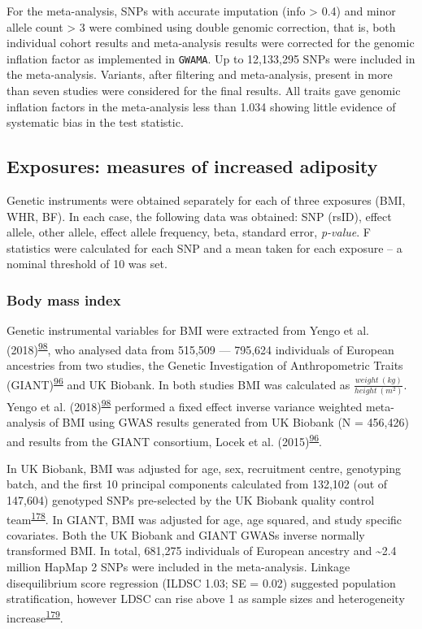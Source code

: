 \documentclass[11pt,twoside]{bristolthesis}
\begin{document}
For the meta-analysis, SNPs with accurate imputation (info \textgreater{} 0.4) and minor allele count \textgreater{} 3 were combined using double genomic correction, that is, both individual cohort results and meta-analysis results were corrected for the genomic inflation factor as implemented in \texttt{GWAMA}. Up to 12,133,295 SNPs were included in the meta-analysis. Variants, after filtering and meta-analysis, present in more than seven studies were considered for the final results. All traits gave genomic inflation factors in the meta-analysis less than 1.034 showing little evidence of systematic bias in the test statistic.

\hypertarget{exposures-measures-of-increased-adiposity}{%
\subsection{Exposures: measures of increased adiposity}\label{exposures-measures-of-increased-adiposity}}

Genetic instruments were obtained separately for each of three exposures (BMI, WHR, BF). In each case, the following data was obtained: SNP (rsID), effect allele, other allele, effect allele frequency, beta, standard error, \emph{p-value}. F statistics were calculated for each SNP and a mean taken for each exposure -- a nominal threshold of 10 was set.

\hypertarget{body-mass-index}{%
\subsubsection{Body mass index}\label{body-mass-index}}

Genetic instrumental variables for BMI were extracted from Yengo et al. (2018)\textsuperscript{\protect\hyperlink{ref-Yengo2018}{98}}, who analysed data from 515,509 --- 795,624 individuals of European ancestries from two studies, the Genetic Investigation of Anthropometric Traits (GIANT)\textsuperscript{\protect\hyperlink{ref-Locke2015}{96}} and UK Biobank. In both studies BMI was calculated as \(\displaystyle \frac{weight\ (kg)}{height\ (m^2)}\). Yengo et al. (2018)\textsuperscript{\protect\hyperlink{ref-Yengo2018}{98}} performed a fixed effect inverse variance weighted meta-analysis of BMI using GWAS results generated from UK Biobank (N = 456,426) and results from the GIANT consortium, Locek et al. (2015)\textsuperscript{\protect\hyperlink{ref-Locke2015}{96}}.

In UK Biobank, BMI was adjusted for age, sex, recruitment centre, genotyping batch, and the first 10 principal components calculated from 132,102 (out of 147,604) genotyped SNPs pre-selected by the UK Biobank quality control team\textsuperscript{\protect\hyperlink{ref-Bycroft2018}{178}}. In GIANT, BMI was adjusted for age, age squared, and study specific covariates. Both the UK Biobank and GIANT GWASs inverse normally transformed BMI. In total, 681,275 individuals of European ancestry and \textasciitilde{}2.4 million HapMap 2 SNPs were included in the meta-analysis. Linkage disequilibrium score regression (ILDSC 1.03; SE = 0.02) suggested population stratification, however LDSC can rise above 1 as sample sizes and heterogeneity increase\textsuperscript{\protect\hyperlink{ref-Loh2018}{179}}.
\end{document}
